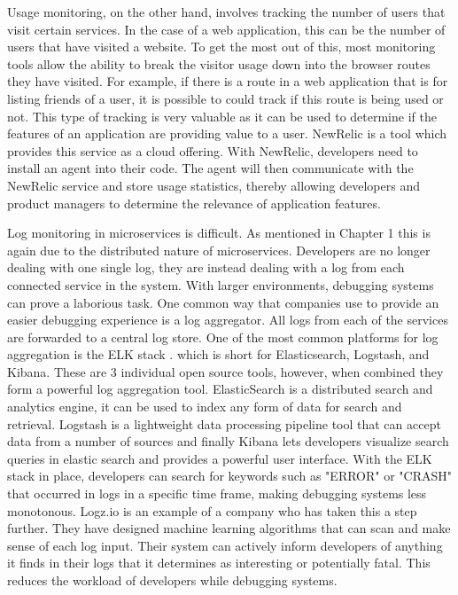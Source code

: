 Usage monitoring, on the other hand, involves tracking the number of users that visit certain services. In the case of a web application, this can be the number of users that have visited a website. To get the most out of this, most monitoring tools allow the ability to break the visitor usage down into the browser routes they have visited. For example, if there is a route in a web application that is for listing friends of a user, it is possible to could track if this route is being used or not. This type of tracking is very valuable as it can be used to determine if the features of an application are providing value to a user. NewRelic \cite{new-relic} is a tool which provides this service as a cloud offering. With NewRelic, developers need to install an agent into their code. The agent will then communicate with the NewRelic service and store usage statistics, thereby allowing developers and product managers to determine the relevance of application features.

Log monitoring in microservices is difficult. As mentioned in Chapter 1 this is again due to the distributed nature of microservices. Developers are no longer dealing with one single log, they are instead dealing with a log from each connected service in the system. With larger environments, debugging systems can prove a laborious task. One common way that companies use to provide an easier debugging experience is a log aggregator. All logs from each of the services are forwarded to a central log store. One of the most common platforms for log aggregation is the ELK stack \cite{8311756}. which is short for Elasticsearch, Logstash, and Kibana. These are 3 individual open source tools, however, when combined they form a powerful log aggregation tool. ElasticSearch is a distributed search and analytics engine, it can be used to index any form of data for search and retrieval. Logstash is a lightweight data processing pipeline tool that can accept data from a number of sources and finally Kibana lets developers visualize search queries in elastic search and provides a powerful user interface. With the ELK stack in place, developers can search for keywords such as "ERROR" or "CRASH" that occurred in logs in a specific time frame, making debugging systems less monotonous. Logz.io \cite{logzio} is an example of a company who has taken this a step further. They have designed machine learning algorithms that can scan and make sense of each log input. Their system can actively inform developers of anything it finds in their logs that it determines as interesting or potentially fatal. This reduces the workload of developers while debugging systems.


